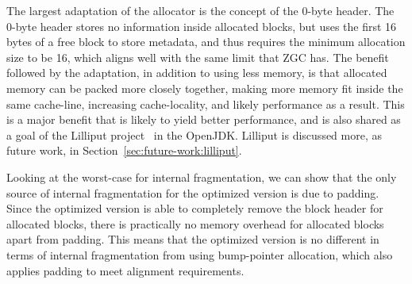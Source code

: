 The largest adaptation of the allocator is the concept of the 0-byte header. The 0-byte header stores no information inside allocated blocks, but uses the first 16 bytes of a free block to store metadata, and thus requires the minimum allocation size to be 16, which aligns well with the same limit that ZGC has. The benefit followed by the adaptation, in addition to using less memory, is that allocated memory can be packed more closely together, making more memory fit inside the same cache-line, increasing cache-locality, and likely performance as a result. This is a major benefit that is likely to yield better performance, and is also shared as a goal of the Lilliput project~\cite{lilliput} in the OpenJDK. Lilliput is discussed more, as future work, in Section~\ref{sec:future-work:lilliput}.

Looking at the worst-case for internal fragmentation, we can show that the only source of internal fragmentation for the optimized version is due to padding. Since the optimized version is able to completely remove the block header for allocated blocks, there is practically no memory overhead for allocated blocks apart from padding. This means that the optimized version is no different in terms of internal fragmentation from using bump-pointer allocation, which also applies padding to meet alignment requirements.

